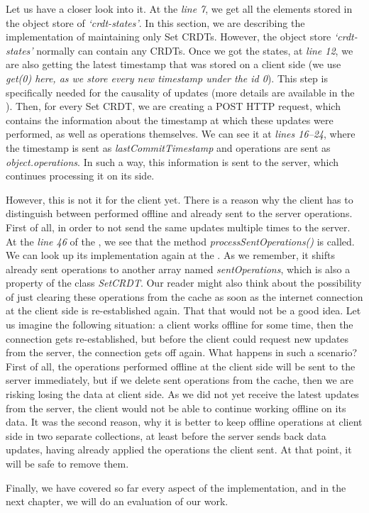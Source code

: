Let us have a closer look into it. At the \textit{line 7}, we get all the elements stored in the object store of \textit{`crdt-states'}. In this section, we are describing the implementation of maintaining only Set CRDTs. However, the object store \textit{`crdt-states'} normally can contain any CRDTs. Once we got the states, at \textit{line 12}, we are also getting the latest timestamp that was stored on a client side (we use \textit{get(0) here, as we store every new timestamp under the id \textit{0}}). This step is specifically needed for the causality of updates (more details are available in the ). Then, for every Set CRDT, we are creating a POST HTTP request, which contains the information about the timestamp at which these updates were performed, as well as operations themselves. We can see it at \textit{lines 16--24}, where the timestamp is sent as \textit{lastCommitTimestamp} and operations are sent as \textit{object.operations}. In such a way, this information is sent to the server, which continues processing it on its side.

However, this is not it for the client yet. There is a reason why the client has to distinguish between performed offline and already sent to the server operations. First of all, in order to not send the same updates multiple times to the server. At the \textit{line 46} of the , we see that the method \textit{processSentOperations()} is called. We can look up its implementation again at the . As we remember, it shifts already sent operations to another array named \textit{sentOperations}, which is also a property of the class \textit{SetCRDT}. Our reader might also think about the possibility of just clearing these operations from the cache as soon as the internet connection at the client side is re-established again. That that would not be a good idea. Let us imagine the following situation: a client works offline for some time, then the connection gets re-established, but before the client could request new updates from the server, the connection gets off again. What happens in such a scenario? First of all, the operations performed offline at the client side will be sent to the server immediately, but if we delete sent operations from the cache, then we are risking losing the data at client side. As we did not yet receive the latest updates from the server, the client would not be able to continue working offline on its data. It was the second reason, why it is better to keep offline operations at client side in two separate collections, at least before the server sends back data updates, having already applied the operations the client sent. At that point, it will be safe to remove them.

Finally, we have covered so far every aspect of the implementation, and in the next chapter, we will do an evaluation of our work.